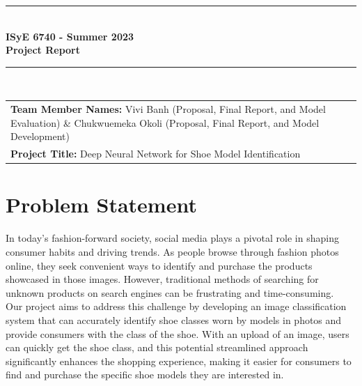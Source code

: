 \documentclass[11pt,a4paper]{article}
\begin{document}

\begin{titlepage}
	\clearpage\thispagestyle{empty}
	\centering
	\vspace{1cm}
		
	\rule{\linewidth}{1mm} \\[0.5cm]
	{ \Large \bfseries ISyE 6740 - Summer 2023\\[0.2cm]
		Project Report}\\[0.5cm]
	\rule{\linewidth}{1mm} \\[1cm]

		\begin{tabular}{l p{5cm}}
		\textbf{Team Member Names:} Vivi Banh (Proposal, Final Report, and Model Evaluation) \& Chukwuemeka Okoli (Proposal, Final Report, and Model Development) \\[10pt]
		\textbf{Project Title:} Deep Neural Network for Shoe Model Identification  \\[10pt]
		\end{tabular} 

\end{titlepage}	
	

\section{Problem Statement}\label{sec1}
In today's fashion-forward society, social media plays a pivotal role in shaping consumer habits and driving trends. As people browse through fashion photos online, they seek convenient ways to identify and purchase the products showcased in those images. However, traditional methods of searching for unknown products on search engines can be frustrating and time-consuming.  \\

\noindent
Our project aims to address this challenge by developing an image classification system that can accurately identify shoe classes worn by models in photos and provide consumers with the class of the shoe. With an upload of an image, users can quickly get the shoe class, and this potential streamlined approach significantly enhances the shopping experience, making it easier for consumers to find and purchase the specific shoe models they are interested in. \\
\end{document}
